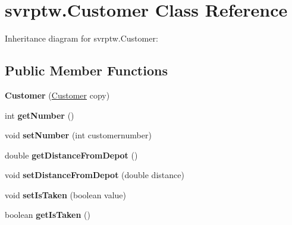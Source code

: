 \hypertarget{classsvrptw_1_1_customer}{}\section{svrptw.\+Customer Class Reference}
\label{classsvrptw_1_1_customer}


Inheritance diagram for svrptw.\+Customer\+:
\subsection*{Public Member Functions}
\begin{DoxyCompactItemize}
\item 
{\bfseries Customer} (\hyperlink{classsvrptw_1_1_customer}{Customer} copy)\hypertarget{classsvrptw_1_1_customer_acf947301cceabc4fa6542689a42afe5c}{}\label{classsvrptw_1_1_customer_acf947301cceabc4fa6542689a42afe5c}

\item 
int {\bfseries get\+Number} ()\hypertarget{classsvrptw_1_1_customer_a8dd7751072aa30d748950bf0e0ca6390}{}\label{classsvrptw_1_1_customer_a8dd7751072aa30d748950bf0e0ca6390}

\item 
void {\bfseries set\+Number} (int customernumber)\hypertarget{classsvrptw_1_1_customer_a99647547ec1ed446511ac04b097a585a}{}\label{classsvrptw_1_1_customer_a99647547ec1ed446511ac04b097a585a}

\item 
double {\bfseries get\+Distance\+From\+Depot} ()\hypertarget{classsvrptw_1_1_customer_ad6fdb4a0ba301b4a3c506e1fa71c2940}{}\label{classsvrptw_1_1_customer_ad6fdb4a0ba301b4a3c506e1fa71c2940}

\item 
void {\bfseries set\+Distance\+From\+Depot} (double distance)\hypertarget{classsvrptw_1_1_customer_a812d735aee6c21a61539979273b85139}{}\label{classsvrptw_1_1_customer_a812d735aee6c21a61539979273b85139}

\item 
void {\bfseries set\+Is\+Taken} (boolean value)\hypertarget{classsvrptw_1_1_customer_ae000c915703a904a5d3286052edfa224}{}\label{classsvrptw_1_1_customer_ae000c915703a904a5d3286052edfa224}

\item 
boolean {\bfseries get\+Is\+Taken} ()\hypertarget{classsvrptw_1_1_customer_af56bd0006ef8da813ef70ee71884fe5b}{}\label{classsvrptw_1_1_customer_af56bd0006ef8da813ef70ee71884fe5b}


\end{DoxyCompactItemize}
